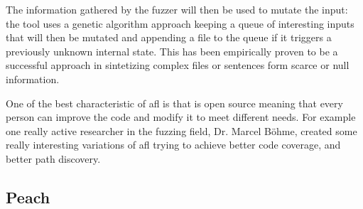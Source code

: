 \documentclass[../main.tex]{subfiles}
\begin{document}
The information gathered by the fuzzer will then be used to mutate the input:
the tool uses a genetic algorithm approach keeping a queue of interesting inputs
that will then be mutated and appending a file to the queue if it triggers a
previously unknown internal state. This has been empirically proven to be a
successful approach in sintetizing complex files or sentences form scarce or
null information\cite{aflblog}.

One of the best characteristic of afl is that is open source meaning that every
person can improve the code and modify it to meet different needs. For example
one really active researcher in the fuzzing field, Dr. Marcel
B\"ohme\cite{mbhome}, created some really interesting variations of afl trying
to achieve better code coverage\cite{aflfast}\cite{greybf}, and better path
discovery\cite{pythia}.

\subsection{Peach}
\end{document}
